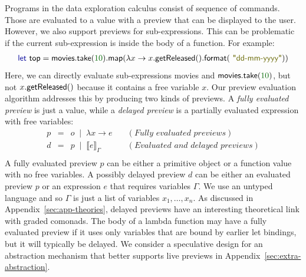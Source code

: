 \documentclass[english,submission]{programming}
\theoremstyle{plain}
\theoremstyle{definition}
\newcommand{\lsep}{\;\;|\;\;}
\newcommand{\num}[1]{\textcolor{numclr}{#1}}
\newcommand{\str}[1]{\textnormal{\textcolor{strclr}{\sffamily "#1"}}}
\newcommand{\ident}[1]{\textnormal{\textcolor{idclr}{\sffamily #1}}}
\newcommand{\kvd}[1]{\textnormal{\textcolor{kvdclr}{\sffamily #1}}}
\begin{document}
Programs in the data exploration calculus consist of sequence of commands. Those are
evaluated to a value with a preview that can be displayed to the user. However, we also support
previews for sub-expressions. This can be problematic if the current sub-expression is inside
the body of a function. For example:
%
\begin{equation*}
\begin{array}{l}
\kvd{let}~\ident{top} = \ident{movies}.\ident{take}(\num{10}).\ident{map}(\lambda x \rightarrow x.\ident{getReleased}().\ident{format}(\str{dd-mm-yyyy}))
\end{array}
\end{equation*}
%
Here, we can directly evaluate sub-expressions \ident{movies} and $\ident{movies}.\ident{take}(\num{10})$,
but not $x.\ident{getReleased}()$ because it contains a free variable $x$. Our preview evaluation algorithm addresses this by
producing two kinds of previews. A \emph{fully evaluated preview} is just a value, while
a \emph{delayed preview} is a partially evaluated expression with free variables:
%
\begin{equation*}
\begin{array}{rcll}
p&=&o \lsep  \lambda x\rightarrow e&\quad(\textit{Fully evaluated previews})\\
d&=&p \lsep  \llbracket e \rrbracket_\Gamma&\quad(\textit{Evaluated and delayed previews})\\
\end{array}
\end{equation*}
%
A fully evaluated preview $p$ can be either a primitive object or a function value with no free
variables. A possibly delayed preview $d$ can be either an evaluated preview $p$ or an expression
$e$ that requires variables $\Gamma$. We use an untyped language and so $\Gamma$ is just a list of
variables $x_1, \ldots, x_n$. As discussed in Appendix~\ref{sec:app-theories},
delayed previews have an interesting theoretical link with graded comonads.
The body of a lambda function may have a fully evaluated preview if it uses only variables that
are bound by earlier let bindings, but it will typically be delayed. We consider a speculative
design for an abstraction mechanism that better supports live previews in
Appendix~\ref{sec:extra-abstraction}.

\end{document}
